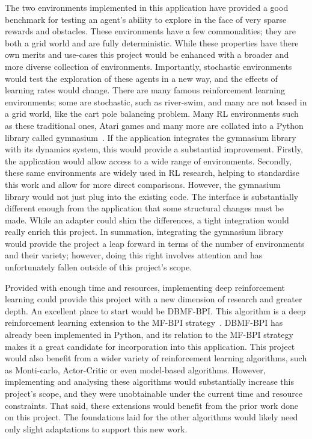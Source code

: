 \documentclass[]{final_report}
\begin{document}
The two environments implemented in this application have provided a good benchmark for testing an agent's ability to explore in the face of very sparse rewards and obstacles. These environments have a few commonalities; they are both a grid world and are fully deterministic. While these properties have there own merits and use-cases this project would be enhanced with a broader and more diverse collection of environments. Importantly, stochastic environments would test the exploration of these agents in a new way, and the effects of learning rates would change. There are many famous reinforcement learning environments; some are stochastic, such as river-swim, and many are not based in a grid world, like the cart pole balancing problem. Many RL environments such as these traditional ones, Atari games and many more are collated into a Python library called gymnasium~\cite{gym}. If the application integrates the gymnasium library with its dynamics system, this would provide a substantial improvement. Firstly, the application would allow access to a wide range of environments. Secondly, these same environments are widely used in RL research, helping to standardise this work and allow for more direct comparisons. However, the gymnasium library would not just plug into the existing code. The interface is substantially different enough from the application that some structural changes must be made. While an adapter could shim the differences, a tight integration would really enrich this project. In summation, integrating the gymnasium library would provide the project a leap forward in terms of the number of environments and their variety; however, doing this right involves attention and has unfortunately fallen outside of this project's scope. 

Provided with enough time and resources, implementing deep reinforcement learning could provide this project with a new dimension of research and greater depth. An excellent place to start would be DBMF-BPI. This algorithm is a deep reinforcement learning extension to the MF-BPI strategy~\cite{modelFree}. DBMF-BPI has already been implemented in Python, and its relation to the MF-BPI strategy makes it a great candidate for incorporation into this application. This project would also benefit from a wider variety of reinforcement learning algorithms, such as Monti-carlo, Actor-Critic or even model-based algorithms. However, implementing and analysing these algorithms would substantially increase this project's scope, and they were unobtainable under the current time and resource constraints. That said, these extensions would benefit from the prior work done on this project. The foundations laid for the other algorithms would likely need only slight adaptations to support this new work. 
\end{document}
